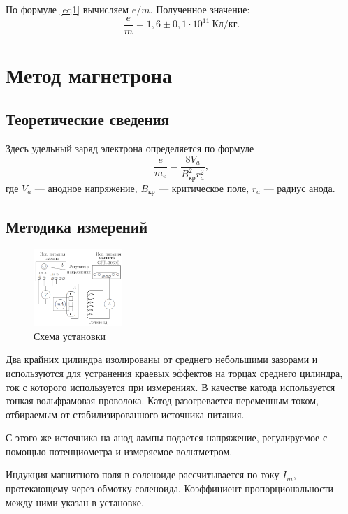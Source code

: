 \documentclass[a4paper, 12pt]{article}
\begin{document}
\vspace{3cm}

По формуле \eqref{eq1} вычисляем $e/m$. Полученное значение: $$\frac{e}{m} = 1,6\pm0,1\cdot 10^{11}~Кл/кг.$$

\section{Метод магнетрона}

\subsection{Теоретические сведения}

Здесь удельный заряд электрона определяется по формуле
\begin{equation}
\dfrac{e}{m_e} = \dfrac{8V_a}{B_{\text{кр}}^2r_a^2},
\end{equation}
где $V_a$ --- анодное напряжение, $B_{\text{кр}}$ --- критическое поле, $r_a$ --- радиус анода.

\subsection{Методика измерений}

\begin{figure}
  \begin{center}
    \includegraphics[width = 0.3\textwidth]{2.png}
  \end{center}
  \caption{Схема установки}
\end{figure}
Два крайних цилиндра изолированы от среднего небольшими зазорами и используются для устранения краевых эффектов на торцах среднего цилиндра, ток с которого используется при измерениях. В качестве катода используется тонкая вольфрамовая проволока. Катод разогревается переменным током, отбираемым от стабилизированного источника питания. 

С этого же источника на анод лампы подается напряжение, регулируемое с помощью потенциометра и измеряемое вольтметром.

Индукция магнитного поля в соленоиде рассчитывается по току $I_m$, протекающему через обмотку соленоида. Коэффициент пропорциональности между ними указан в установке.
\end{document}
